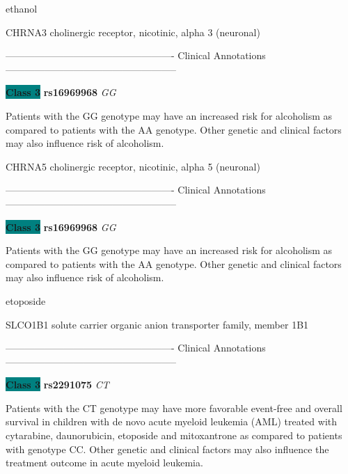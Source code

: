 \documentclass{resume} %
\begin{document}
\begin{rSection}{ ethanol }
\begin{rSubsection}{ CHRNA3 }{ cholinergic receptor, nicotinic, alpha 3 (neuronal) }{}{}
\item[] ---------------------------------------------------- Clinical Annotations -----------------------------------------------------\newline
\item \textbf{\colorbox{teal} {Class 3}} \textbf{ rs16969968 } \textit{ GG }
\item[] Patients with the GG genotype may have an increased risk for alcoholism as compared to patients with the AA genotype. Other genetic and clinical factors may also influence risk of alcoholism.
\end{rSubsection}\begin{rSubsection}{ CHRNA5 }{ cholinergic receptor, nicotinic, alpha 5 (neuronal) }{}{}
\item[]

\item[] ---------------------------------------------------- Clinical Annotations -----------------------------------------------------\newline
\item \textbf{\colorbox{teal} {Class 3}} \textbf{ rs16969968 } \textit{ GG }
\item[] Patients with the GG genotype may have an increased risk for alcoholism as compared to patients with the AA genotype. Other genetic and clinical factors may also influence risk of alcoholism.
\end{rSubsection}

\end{rSection}\begin{rSection}{ etoposide }
\item[]

\begin{rSubsection}{ SLCO1B1 }{ solute carrier organic anion transporter family, member 1B1 }{}{}
\item[]

\item[] ---------------------------------------------------- Clinical Annotations -----------------------------------------------------\newline
\item \textbf{\colorbox{teal} {Class 3}} \textbf{ rs2291075 } \textit{ CT }
\item[] Patients with the CT genotype may have more favorable event-free and overall survival in children with de novo acute myeloid leukemia (AML) treated with cytarabine, daunorubicin, etoposide and mitoxantrone as compared to patients with genotype CC. Other genetic and clinical factors may also influence the treatment outcome in acute myeloid leukemia.
\end{rSubsection}


\end{rSection}
\end{document}

